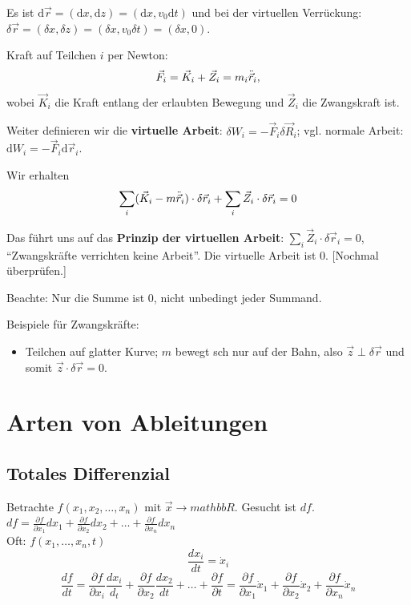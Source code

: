 Es ist $\mathrm{d} \vec{r} = (\mathrm{d} x, \mathrm{d} z) = (\mathrm{d} x, v_0 \mathrm{d} t)$ und bei der virtuellen Verrückung: $\delta \vec{r} = (\delta x, \delta z) = (\delta x, v_0 \delta t) = (\delta x, 0)$.

Kraft auf Teilchen $i$ per Newton: 
\[
	\vec{F}_i = \vec{K}_i + \vec{Z}_i = m_i \ddot{\vec{r}}_i,
\]
wobei $\vec{K}_i$ die Kraft entlang der erlaubten Bewegung und $\vec{Z}_i$ die Zwangskraft ist.

Weiter definieren wir die \textbf{virtuelle Arbeit}: $\delta W_i = - \vec{F}_i \delta \vec{R}_i$; vgl. normale Arbeit: $\mathrm{d} W_i = -\vec{F}_i \mathrm{d} \vec{r}_i$.

Wir erhalten
\[
	\sum_i (\vec{K}_i - m \ddot{\vec{r}}_i) \cdot \delta \vec{r}_i + \sum_i \vec{Z}_i \cdot \delta \vec{r}_i = 0
\]

Das führt uns auf das \textbf{Prinzip der virtuellen Arbeit}: $\sum_i \vec{Z}_i \cdot \delta \vec{r}_i = 0$, "`Zwangskräfte verrichten keine Arbeit"'. Die virtuelle Arbeit ist 0. [Nochmal überprüfen.]

Beachte: Nur die Summe ist $0$, nicht unbedingt jeder Summand.

Beispiele für Zwangskräfte: 
\begin{itemize}
	\item Teilchen auf glatter Kurve; $m$ bewegt sch nur auf der Bahn, also $\vec{z} \perp \delta \vec{r}$ und somit $\vec{z} \cdot \delta \vec{r} = 0$.
\end{itemize}

\section{Arten von Ableitungen}
\subsection{Totales Differenzial}
Betrachte $f(x_1, x_2, \ldots, x_n)$ mit $\vec x \rightarrow mathbb{R}$. Gesucht ist $df$.\\

$df = \frac{\partial f}{\partial x_1} dx_1 + \frac{\partial f}{\partial x_2} dx_2 + \ldots + \frac{\partial f}{\partial x_n} dx_n$\\

Oft: $f(x_1, \ldots, x_n, t)$
\[ \frac{dx_i}{dt} = \dot x_i \]
\[ \frac{df}{dt} = \frac{\partial f}{\partial x_i} \frac{d x_i}{d_t} + \frac{\partial f}{\partial x_2} \frac{d x_2}{d t} + \ldots + \frac{\partial f}{\partial t} = \frac{\partial f}{\partial x_1} \dot x_1 + \frac{\partial f}{\partial x_2} \dot x_2 + \frac{\partial f}{\partial x_n} \dot x_n \]